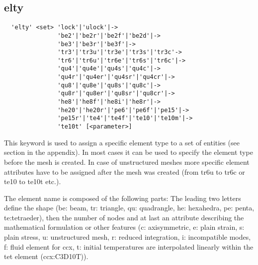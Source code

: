 \documentclass{article}
\begin{document}
\subsection{\label{elty}elty}
\begin{verbatim}
  'elty' <set> 'lock'|'ulock'|->
               'be2'|'be2r'|'be2f'|'be2d'|->
               'be3'|'be3r'|'be3f'|->
               'tr3'|'tr3u'|'tr3e'|'tr3s'|'tr3c'->
               'tr6'|'tr6u'|'tr6e'|'tr6s'|'tr6c'|->
               'qu4'|'qu4e'|'qu4s'|'qu4c'|->
               'qu4r'|'qu4er'|'qu4sr'|'qu4cr'|->
               'qu8'|'qu8e'|'qu8s'|'qu8c'|->
               'qu8r'|'qu8er'|'qu8sr'|'qu8cr'|->
               'he8'|'he8f'|'he8i'|'he8r'|->
               'he20'|'he20r'|'pe6'|'pe6f'|'pe15'|->
               'pe15r'|'te4'|'te4f'|'te10'|'te10m'|->
               'te10t' [<parameter>]
\end{verbatim}
This keyword is used to assign a specific element type to a set of entities
(see section  in the appendix). In most
cases it can be used to specify the element type before the mesh is
created. In case of unstructured meshes more specific element attributes have to be assigned after the mesh was created (from tr6u to tr6c or te10 to te10t etc.). 

The element name is composed of the following parts: The leading two letters
define the shape (be: beam, tr: triangle, qu: quadrangle, he: hexahedra, pe:
penta, te:tetraeder), then the number of nodes and at last an attribute
describing the mathematical formulation or other features (c: axisymmetric, e: plain strain, s: plain
stress, u: unstructured mesh, r: reduced integration, i: incompatible modes,
f: fluid element for ccx, t: initial temperatures are interpolated linearly
within the tet element (ccx:C3D10T)).
\end{document}
